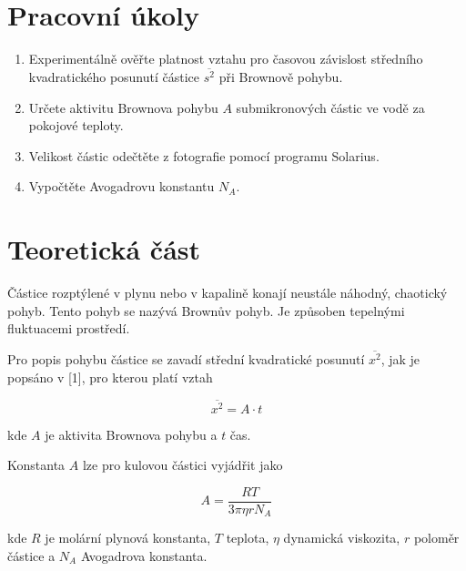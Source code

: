 \section{Pracovní úkoly}

\begin{enumerate}
\item Experimentálně ověřte platnost vztahu pro časovou závislost středního kvadratického posunutí částice \(\overline{s^2}\) při Brownově pohybu.

\item Určete aktivitu Brownova pohybu \(A\) submikronových částic ve vodě za pokojové teploty.

\item Velikost částic odečtěte z fotografie pomocí programu Solarius.

\item Vypočtěte Avogadrovu konstantu \(N_A\).

\end{enumerate}

\section{Teoretická část}

Částice rozptýlené v plynu nebo v kapalině konají neustále náhodný, chaotický pohyb. Tento pohyb se nazývá Brownův pohyb. Je způsoben tepelnými fluktuacemi prostředí.

Pro popis pohybu částice se zavadí střední kvadratické posunutí \(\overline{x^2}\), jak je popsáno v [1], pro kterou platí vztah

\begin{equation}
    \overline{x^2} = A \cdot t
\end{equation}

kde \(A\) je aktivita Brownova pohybu a \(t\) čas.

Konstanta \(A\) lze pro kulovou částici vyjádřit jako

\begin{equation}
    A = \frac{R T}{3 \pi \eta r N_A}
\end{equation}

kde \(R\) je molární plynová konstanta, \(T\) teplota, \(\eta\) dynamická viskozita, \(r\) poloměr částice a \(N_A\) Avogadrova konstanta.

